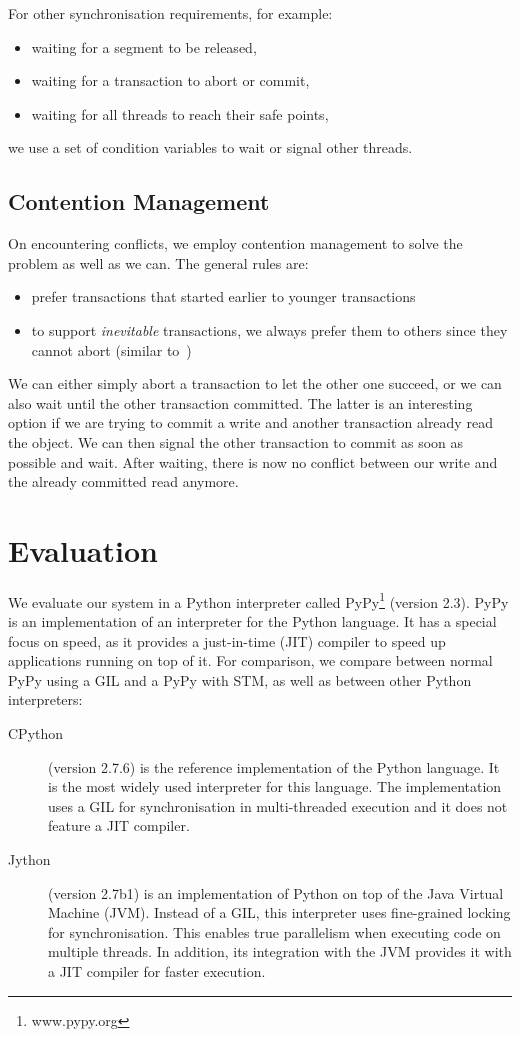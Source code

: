 \documentclass{sigplanconf}
\begin{document}
For other synchronisation requirements, for example:
\begin{itemize}[noitemsep]
\item waiting for a segment to be released,
\item waiting for a transaction to abort or commit,
\item waiting for all threads to reach their safe points,
\end{itemize}
we use a set of condition variables to wait or signal other threads.


\subsection{Contention Management\label{subsub:contentionmanagement}}

On encountering conflicts, we employ contention management to solve
the problem as well as we can. The general rules are:
\begin{itemize}[noitemsep]
\item prefer transactions that started earlier to younger transactions
\item to support \emph{inevitable} transactions, we always prefer them
  to others since they cannot abort (similar to~\cite{blundell06})
\end{itemize}
We can either simply abort a transaction to let the other one succeed,
or we can also wait until the other transaction committed. The latter
is an interesting option if we are trying to commit a write and
another transaction already read the object. We can then signal the
other transaction to commit as soon as possible and wait. After
waiting, there is now no conflict between our write and the already
committed read anymore.



\section{Evaluation}

We evaluate our system in a Python interpreter called
PyPy\footnote{www.pypy.org} (version 2.3). PyPy is an implementation of an
interpreter for the Python language. It has a special focus on speed,
as it provides a just-in-time (JIT) compiler to speed up applications
running on top of it. For comparison, we compare between normal PyPy
using a GIL and a PyPy with STM, as well as between other Python interpreters:
\begin{description}
\item[CPython] (version 2.7.6) is the reference implementation of the Python
  language. It is the most widely used interpreter for this language.
  The implementation uses a GIL for synchronisation in multi-threaded
  execution and it does not feature a JIT compiler.
\item[Jython] (version 2.7b1) is an implementation of Python on top of
  the Java Virtual Machine (JVM). Instead of a GIL, this interpreter
  uses fine-grained locking for synchronisation. This enables true
  parallelism when executing code on multiple threads. In addition, its
  integration with the JVM provides it with a JIT compiler for faster
  execution.
\end{description}
\end{document}
